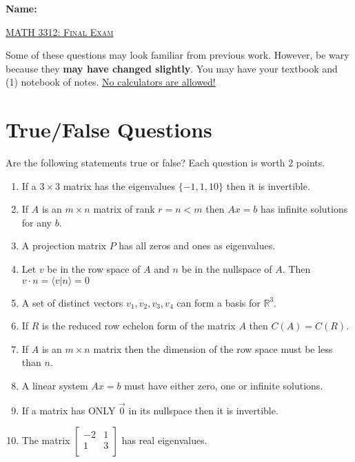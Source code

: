 \documentclass[12pt, a4paper]{article}
\theoremstyle{break}
\begin{document}
\begin{flushleft}
\Large \textbf{Name: } \underline{\hspace{8cm}} \\
\end{flushleft}
\vspace{0.25in}
\begin{center}
{\Large \textsc{\underline{MATH 3312: Final Exam}}}
\vspace{0.125in}
\end{center}
Some of these questions may look familiar from previous work. However, be wary because they \textbf{may have changed slightly}. You may have your textbook and (1) notebook of notes. \underline{No calculators are allowed!}
\section{True/False Questions}
Are the following statements true or false? Each question is worth 2 points. 
\begin{enumerate}
\item \underline{\hspace{1cm}} If a $3 \times 3$ matrix has the eigenvalues $\{ -1,1,10\}$ then it is invertible. 
\item \underline{\hspace{1cm}}  If $A$ is an $m\times n$ matrix of rank $r=n<m$ then $Ax=b$ has infinite solutions for any $b$. 
\item \underline{\hspace{1cm}} A projection matrix $P$ has all zeros and ones as eigenvalues. 
\item \underline{\hspace{1cm}} Let $v$ be in the row space of $A$ and $n$ be in the nullspace of $A$. Then $v \cdot n=\langle v | n \rangle=0$
\item \underline{\hspace{1cm}} A set of distinct vectors $v_1, v_2, v_3, v_4$ can form a basis for $\mathbb{R}^3$. 
\item \underline{\hspace{1cm}} If $R$ is the reduced row echelon form of the matrix $A$ then $C(A)=C(R)$. 
\item  \underline{\hspace{1cm}} If $A$ is an $m \times n$ matrix then the dimension of the row space must be less than $n$. 
\item  \underline{\hspace{1cm}} A linear system $Ax=b$ must have either zero, one or infinite solutions. 
\item  \underline{\hspace{1cm}} If a matrix has ONLY $\vec{0}$ in its nullspace then it is invertible.
\item  \underline{\hspace{1cm}} The matrix $
\begin{bmatrix}
-2 & 1 \\
1 & 3 \\
\end{bmatrix}$
has real eigenvalues.
\end{enumerate}
\newpage
\end{document}
